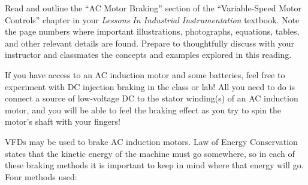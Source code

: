 

Read and outline the ``AC Motor Braking'' section of the ``Variable-Speed Motor Controls'' chapter in your {\it Lessons In Industrial Instrumentation} textbook.  Note the page numbers where important illustrations, photographs, equations, tables, and other relevant details are found.  Prepare to thoughtfully discuss with your instructor and classmates the concepts and examples explored in this reading.







If you have access to an AC induction motor and some batteries, feel free to experiment with DC injection braking in the class or lab!  All you need to do is connect a source of low-voltage DC to the stator winding(s) of an AC induction motor, and you will be able to feel the braking effect as you try to spin the motor's shaft with your fingers!







VFDs may be used to brake AC induction motors.  Law of Energy Conservation states that the kinetic energy of the machine must go somewhere, so in each of these braking methods it is important to keep in mind where that energy will go.  Four methods used:

